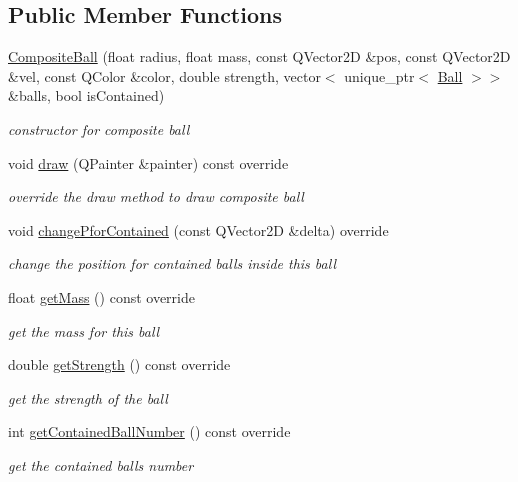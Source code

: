 \subsection*{Public Member Functions}
\begin{DoxyCompactItemize}
\item 
\mbox{\hyperlink{class_composite_ball_a5d9c99050f3844f59918fca2a1540cb4}{Composite\+Ball}} (float radius, float mass, const Q\+Vector2D \&pos, const Q\+Vector2D \&vel, const Q\+Color \&color, double strength, vector$<$ unique\+\_\+ptr$<$ \mbox{\hyperlink{class_ball}{Ball}} $>$$>$ \&balls, bool is\+Contained)
\begin{DoxyCompactList}\small\item\em constructor for composite ball \end{DoxyCompactList}\item 
void \mbox{\hyperlink{class_composite_ball_a976f7cc1cec45385c0a0f81cd69c2352}{draw}} (Q\+Painter \&painter) const override
\begin{DoxyCompactList}\small\item\em override the draw method to draw composite ball \end{DoxyCompactList}\item 
void \mbox{\hyperlink{class_composite_ball_a1e559c1b9d9b4905599c370c79990576}{change\+Pfor\+Contained}} (const Q\+Vector2D \&delta) override
\begin{DoxyCompactList}\small\item\em change the position for contained balls inside this ball \end{DoxyCompactList}\item 
float \mbox{\hyperlink{class_composite_ball_afa621612641fecb3af81390bfbe7d941}{get\+Mass}} () const override
\begin{DoxyCompactList}\small\item\em get the mass for this ball \end{DoxyCompactList}\item 
double \mbox{\hyperlink{class_composite_ball_a1585c03baf89ce19c58806dfa6eac131}{get\+Strength}} () const override
\begin{DoxyCompactList}\small\item\em get the strength of the ball \end{DoxyCompactList}\item 
int \mbox{\hyperlink{class_composite_ball_a8120a00750a9bb77fd6e41f98de119b3}{get\+Contained\+Ball\+Number}} () const override
\begin{DoxyCompactList}\small\item\em get the contained ball\textquotesingle{}s number \end{DoxyCompactList}\item 
$$
\end{DoxyCompactItemize}
